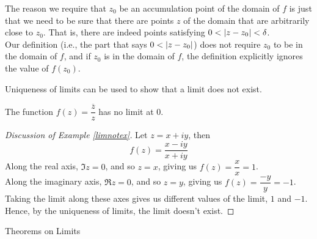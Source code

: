 \vspace*{1em}

\begin{remark}
The reason we require that $z_0$ be an accumulation point of the domain of $f$ is just that we need to be sure that there are points $z$ of the domain that are arbitrarily close to $z_0$. That is, there are indeed points satisfying $0< \left\lvert z-z_0\right\rvert < \delta$.\\[0.5em]
Our definition (i.e., the part that says $0 < \left\lvert z - z_0\right\rvert$) does not require $z_0$ to be in the domain of $f$, and if $z_0$ is in the domain of $f$, the definition explicitly ignores the value of $f(z_0)$.
\end{remark}

\vspace*{1em}

Uniqueness of limits can be used to show that a limit does not exist.
\begin{example}\label{limnotex}
The function $f(z) = \dfrac{\overline{z}}{z}$ has no limit at $0$.
\end{example}
\begin{proof}[Discussion of Example \ref{limnotex}]
Let $z = x + iy$, then
\[f(z) = \frac{x - iy}{x + iy}\]
Along the real axis, $\Im z = 0$, and so $z = x$, giving us $f(z) = \dfrac{x}{x} = 1$.\\[0.5em]
Along the imaginary axis, $\Re z = 0$, and so $z = y$, giving us $f(z) = \dfrac{-y}{y} = -1$.\\[0.5em]
Taking the limit along these axes gives us different values of the limit, $1$ and $-1$. Hence, by the uniqueness of limits, the limit doesn't exist.
\end{proof}

\vspace*{1em}

\begin{mdframed}
\begin{center}
{\Large Theorems on Limits}
\end{center}
\end{mdframed}

